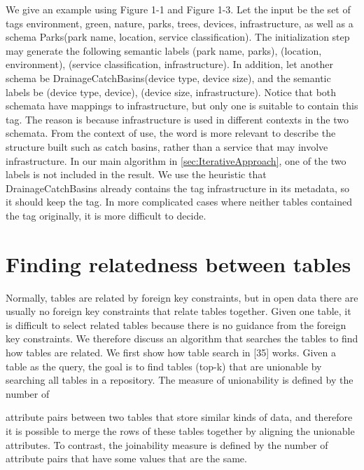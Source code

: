 We give an example using Figure 1-1 and Figure 1-3. Let the input be the set of tags {environment, green, nature, parks, trees, devices, infrastructure}, as well as a schema Parks(park name, location, service classification). The initialization step may generate the following semantic labels (park name, parks), (location, environment), (service classification, infrastructure). In addition, let another schema be DrainageCatchBasins(device type, device size), and the semantic labels be (device type, device), (device size, infrastructure).
Notice that both schemata have mappings to infrastructure, but only one is suitable to contain this tag. The reason is because infrastructure is used in different contexts in the two schemata. From the context of use, the word is more relevant to describe the structure built such as catch basins, rather than a service that may involve infrastructure. In our main algorithm in \autoref{sec:IterativeApproach}, one of the two labels is not included in the result. We use the heuristic that DrainageCatchBasins already contains the tag infrastructure in its metadata, so it should keep the tag. In more complicated cases where neither tables contained the tag originally, it is more difficult to decide.

\section{Finding relatedness between tables}
\label{sec:FindingRelatednessBetweenTables}

Normally, tables are related by foreign key constraints, but in open data there are usually no foreign key constraints that relate tables together. Given one table, it is difficult to select related tables because there is no guidance from the foreign key constraints. We therefore discuss an algorithm that searches the tables to find how tables are related. We first show how table search in [35] works. Given a table as the query, the goal is to find tables (top-k) that are unionable by searching all tables in a repository. The measure of unionability is defined by the number of

attribute pairs between two tables that store similar kinds of data, and therefore it is possible to merge the rows of these tables together by aligning the unionable attributes. To contrast, the joinability measure is defined by the number of attribute pairs that have some values that are the same.

